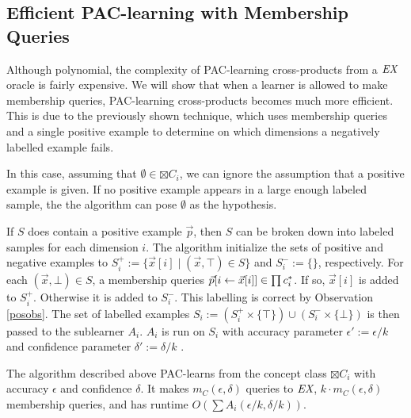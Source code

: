 \subsection{Efficient PAC-learning with Membership Queries}

Although polynomial, the complexity of PAC-learning cross-products from a $\emph{EX}$ oracle is fairly expensive. 
We will show that when a learner is allowed to make membership queries, PAC-learning cross-products becomes much more efficient. 
This is due to the previously shown technique, which uses membership queries and a single positive example to determine on which dimensions a negatively labelled example fails. 

In this case, assuming that $\emptyset \in \boxtimes C_i$, we can ignore the assumption that a positive example is given. 
If no positive example appears in a large enough labeled sample, the the algorithm can pose $\emptyset$ as the hypothesis.






If $S$ does contain a positive example $\vec{p}$, then $S$ can be broken down into labeled samples for each dimension $i$. 
The algorithm initialize the sets of positive and negative examples to $S^+_i := \{ \vec{x}[i] \mid  (\vec{x}, \top) \in S\}$ and $S^-_i := \{ \}$, respectively.
For each $(\vec{x}, \bot) \in S$, a membership queries $\vec{p}[i \leftarrow \vec{x}[i]] \in \prod c^*_i$. 
If so, $\vec{x}[i] $ is added to $S^+_i$.
Otherwise it is added to $S^-_i$.
This labelling is correct by Observation \ref{posobs}.
The set of labelled examples $S_i := (S_i^+ \times \{\top\}) \cup (S_i^- \times \{\bot\})$ is then passed to the sublearner $A_i$.
$A_i$ is run on $S_i$ with accuracy parameter $\epsilon' := \epsilon / k$ and confidence parameter $\delta' := \delta / k$ .


\begin{proposition}
The algorithm described above PAC-learns from the concept class $\boxtimes C_i$ with accuracy $\epsilon$ and confidence $\delta$.
It makes $m_C(\epsilon, \delta)$ queries to $\emph{EX}$, $k \cdot m_C(\epsilon, \delta)$ membership queries, and has runtime $O(\sum A_i(\epsilon / k, \delta / k))$.
\end{proposition}
